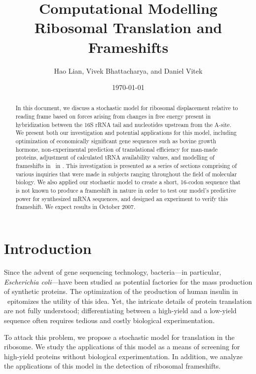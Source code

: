 \documentclass[12pt]{article}
\author{{\sc Hao Lian, Vivek Bhattacharya, and Daniel Vitek}}
\date{{\sc \today}}
\title{{\bf Computational Modelling Ribosomal Translation
    and Frameshifts}}
\numberwithin{equation}{section}
\begin{document}
\maketitle
\tableofcontents
\clearpage

\begin{abstract}
  \begin{normalsize}
  In this document, we discuss a stochastic model for ribosomal displacement relative to reading 
  frame based on forces arising from changes in free energy present in hybridization between the 
  16S rRNA tail and nucleotides upstream from the A-site.  We present both our investigation and 
  potential applications for this model, including optimization of economically significant gene
  sequences such as bovine growth hormone, non-experimental prediction of translational efficiency for man-made 
  proteins, adjustment of calculated tRNA availability values, and modelling of frameshifts in \prfB\ in \ecoli.  This
  investigation is presented as a series of sections comprising of various inquiries that were made 
  in subjects ranging throughout the field of molecular biology.  We also applied our stochastic 
  model to create a short, 16-codon sequence that is not known to produce a frameshift in nature 
  in order to test our model's predictive power for synthesized mRNA sequences, and designed an 
  experiment to verify this frameshift.  We expect results in October 2007.
  \end{normalsize}
\end{abstract}

\clearpage

\section{Introduction}

Since the advent of gene sequencing technology, bacteria---in particular,
\emph{Escherichia coli}---have been studied as potential factories for the
mass production of synthetic proteins.  The optimization of the production
of human insulin in \ecoli\ epitomizes the utility of this idea.  Yet, the
intricate details of protein translation are not fully understood; differentiating
between a high-yield and a low-yield sequence often requires tedious and costly
biological experimentation.  

To attack this problem, we propose a stochastic model for translation in the 
ribosome.  We study the applications of this model as a means of screening for 
high-yield proteins without biological experimentation.  In addition, we analyze 
the applications of this model in the detection of ribosomal frameshifts.
\end{document}
